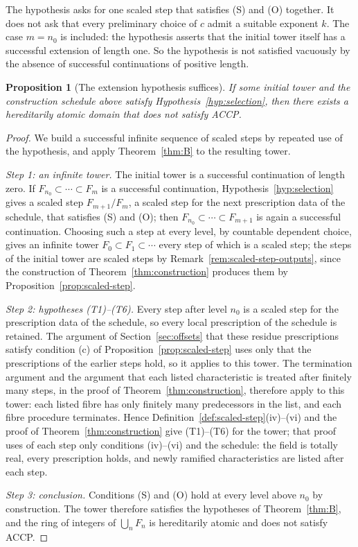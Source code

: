 \documentclass[11pt]{article}
\theoremstyle{plain}
\newtheorem{proposition}[theorem]{Proposition}
\theoremstyle{definition}
\theoremstyle{remark}
\begin{document}
The hypothesis asks for one scaled step that satisfies (S) and (O)
together.  It does not ask that every preliminary choice of $c$ admit a
suitable exponent $k$.  The case $m=n_0$ is included: the hypothesis
asserts that the initial tower itself has a successful extension of
length one.  So the hypothesis is not satisfied vacuously by the absence
of successful continuations of positive length.

\begin{proposition}[The extension hypothesis suffices]\label{prop:selection}
If some initial tower and the construction schedule above satisfy
Hypothesis~\ref{hyp:selection}, then there exists a hereditarily
atomic domain that does not satisfy ACCP.
\end{proposition}
\begin{proof}
We build a successful infinite sequence of scaled steps by repeated use
of the hypothesis, and apply Theorem~\ref{thm:B} to the resulting tower.

\emph{Step 1: an infinite tower.}  The initial tower is a successful
continuation of length zero.  If $F_{n_0}\subset\cdots\subset F_m$ is a
successful continuation, Hypothesis~\ref{hyp:selection} gives a scaled
step $F_{m+1}/F_m$, a scaled step for the next prescription data of the
schedule, that satisfies (S) and (O); then
$F_{n_0}\subset\cdots\subset F_{m+1}$ is again a successful
continuation.  Choosing such a step at every level, by countable
dependent choice, gives an infinite tower
$F_0\subset F_1\subset\cdots$ every step of which is a scaled step; the
steps of the initial tower are scaled steps by
Remark~\ref{rem:scaled-step-outputs}, since the construction of
Theorem~\ref{thm:construction} produces them by
Proposition~\ref{prop:scaled-step}.

\emph{Step 2: hypotheses \textup{(T1)--(T6)}.}  Every step after
level $n_0$ is a scaled step for the prescription data of the schedule,
so every local prescription of the schedule is retained.  The argument of
Section~\ref{sec:offsets} that these residue prescriptions satisfy
condition (c) of Proposition~\ref{prop:scaled-step} uses only that the
prescriptions of the earlier steps hold, so it applies to this tower.  The
termination argument and the argument that each listed characteristic is
treated after finitely many steps, in the proof of
Theorem~\ref{thm:construction}, therefore apply to this tower: each
listed fibre has only finitely many predecessors in the list, and each
fibre procedure terminates.  Hence
Definition~\ref{def:scaled-step}(iv)--(vi) and the proof of
Theorem~\ref{thm:construction} give \textup{(T1)--(T6)} for the tower;
that proof uses of each step only conditions (iv)--(vi) and the
schedule: the field is totally real, every prescription holds, and newly
ramified characteristics are listed after each step.

\emph{Step 3: conclusion.}  Conditions (S) and (O) hold at every level
above $n_0$ by construction.  The tower therefore satisfies the hypotheses
of Theorem~\ref{thm:B}, and the ring of integers of $\bigcup_nF_n$ is
hereditarily atomic and does not satisfy ACCP.
\end{proof}
\end{document}
